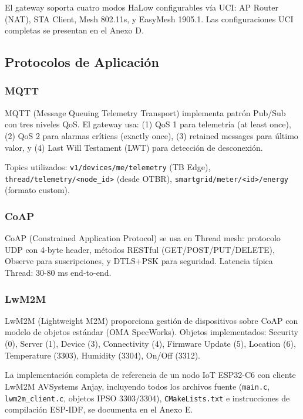 El gateway soporta cuatro modos HaLow configurables vía UCI: AP Router (NAT), STA Client, Mesh 802.11s, y EasyMesh 1905.1. Las configuraciones UCI completas se presentan en el Anexo D.

\subsection{Protocolos de Aplicación}

\subsubsection{MQTT}

MQTT (Message Queuing Telemetry Transport) implementa patrón Pub/Sub con tres niveles QoS. El gateway usa: (1) QoS 1 para telemetría (at least once), (2) QoS 2 para alarmas críticas (exactly once), (3) retained messages para último valor, y (4) Last Will Testament (LWT) para detección de desconexión.

Topics utilizados: \texttt{v1/devices/me/telemetry} (TB Edge), \texttt{thread/telemetry/<node\_id>} (desde OTBR), \texttt{smartgrid/meter/<id>/energy} (formato custom).

\subsubsection{CoAP}

CoAP (Constrained Application Protocol) se usa en Thread mesh: protocolo UDP con 4-byte header, métodos RESTful (GET/POST/PUT/DELETE), Observe para suscripciones, y DTLS+PSK para seguridad. Latencia típica Thread: 30-80 ms end-to-end.

\subsubsection{LwM2M}

LwM2M (Lightweight M2M) proporciona gestión de dispositivos sobre CoAP con modelo de objetos estándar (OMA SpecWorks). Objetos implementados: Security (0), Server (1), Device (3), Connectivity (4), Firmware Update (5), Location (6), Temperature (3303), Humidity (3304), On/Off (3312).

La implementación completa de referencia de un nodo IoT ESP32-C6 con cliente LwM2M AVSystems Anjay, incluyendo todos los archivos fuente (\texttt{main.c}, \texttt{lwm2m\_client.c}, objetos IPSO 3303/3304), \texttt{CMakeLists.txt} e instrucciones de compilación ESP-IDF, se documenta en el Anexo E.

